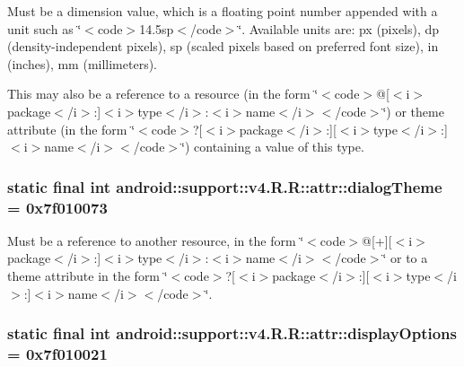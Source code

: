 Must be a dimension value, which is a floating point number appended with a unit such as \char`\"{}$<$code$>$14.5sp$<$/code$>$\char`\"{}. Available units are: px (pixels), dp (density-independent pixels), sp (scaled pixels based on preferred font size), in (inches), mm (millimeters). 

This may also be a reference to a resource (in the form \char`\"{}$<$code$>$@\mbox{[}$<$i$>$package$<$/i$>$:\mbox{]}$<$i$>$type$<$/i$>$:$<$i$>$name$<$/i$>$$<$/code$>$\char`\"{}) or theme attribute (in the form \char`\"{}$<$code$>$?\mbox{[}$<$i$>$package$<$/i$>$:\mbox{]}\mbox{[}$<$i$>$type$<$/i$>$:\mbox{]}$<$i$>$name$<$/i$>$$<$/code$>$\char`\"{}) containing a value of this type. \hypertarget{classandroid_1_1support_1_1v4_1_1_r_1_1attr_86227e47534b7ea4e4d0565a89b26147}{
\subsubsection[{dialogTheme}]{\setlength{\rightskip}{0pt plus 5cm}static final int android::support::v4.R.R::attr::dialogTheme = 0x7f010073}}
\label{classandroid_1_1support_1_1v4_1_1_r_1_1attr_86227e47534b7ea4e4d0565a89b26147}


Must be a reference to another resource, in the form \char`\"{}$<$code$>$@\mbox{[}+\mbox{]}\mbox{[}$<$i$>$package$<$/i$>$:\mbox{]}$<$i$>$type$<$/i$>$:$<$i$>$name$<$/i$>$$<$/code$>$\char`\"{} or to a theme attribute in the form \char`\"{}$<$code$>$?\mbox{[}$<$i$>$package$<$/i$>$:\mbox{]}\mbox{[}$<$i$>$type$<$/i$>$:\mbox{]}$<$i$>$name$<$/i$>$$<$/code$>$\char`\"{}. \hypertarget{classandroid_1_1support_1_1v4_1_1_r_1_1attr_e6a6f84b45e6aa9ce300c8a476b6419b}{
\subsubsection[{displayOptions}]{\setlength{\rightskip}{0pt plus 5cm}static final int android::support::v4.R.R::attr::displayOptions = 0x7f010021}}
\label{classandroid_1_1support_1_1v4_1_1_r_1_1attr_e6a6f84b45e6aa9ce300c8a476b6419b}


